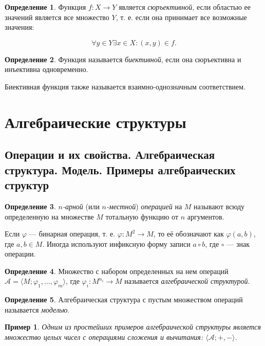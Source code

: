 \documentclass{article}
\theoremstyle{plain}
\newtheorem*{example*}{Пример}
\theoremstyle{definition}
\newtheorem{definition}{Определение}[subsection]
\begin{document}
\begin{definition}
	Функция \(f: X \rightarrow Y\) является \textit{сюръективной}, если областью ее значений является все множество \(Y\), т. е. если она принимает все возможные значения:

	\[
		\forall y \in Y \exists x \in X \colon (x, y) \in f.
	\]
\end{definition}

\begin{definition}
	Функция называется \textit{биективной}, если она сюръективна и инъективна одновременно.
\end{definition}

Биективная функция также называется взаимно-однозначным соответствием.

\section{Алгебраические структуры}

\subsection{Операции и их свойства. Алгебраическая структура. Модель. Примеры алгебраических структур}

\begin{definition}
	\textit{\(n\)-арной} (или \textit{\(n\)-местной}) \textit{операцией} на \(M\) называют всюду определенную на множестве \(M\) тотальную функцию от \(n\) аргументов.
\end{definition}

Если \(\varphi\) --- бинарная операция, т. е. \(\varphi \colon M^2 \rightarrow M\), то её обозначают как \(\varphi(a, b)\), где \(a, b \in M\). Иногда используют инфиксную форму записи \(a \circ b\), где \(\circ\) --- знак операции.

\begin{definition}
	Множество с набором определенных на нем операций \(\mathcal{A} = \langle M; \varphi_1, \ldots, \varphi_m \rangle\), где \(\varphi_i \colon M^{n_i} \rightarrow M\) называется \textit{алгебраической структурой}.
\end{definition}

\begin{definition}
	Алгебраическая структура с пустым множеством операций называется \textit{моделью}.
\end{definition}

\begin{example*}
	Одним из простейших примеров алгебраической структуры является множество целых чисел с операциями сложения и вычитания: \(\langle \mathcal{A}; +, -\rangle\).
\end{example*}
\end{document}

